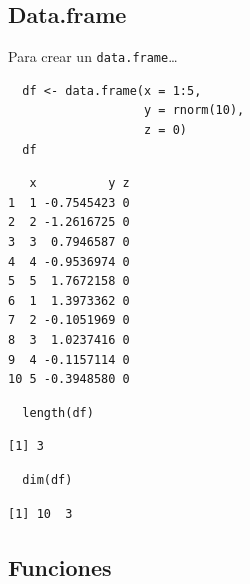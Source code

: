 \documentclass[xcolor={usenames,svgnames,dvipsnames}]{beamer}
\begin{document}
\subsection{Data.frame}
\label{sec-2-4}
\begin{frame}[fragile,label=sec-2-4-1]{Para crear un \texttt{data.frame}\ldots{}}
 \lstset{language=R,label= ,caption= ,numbers=none}
\begin{lstlisting}
  df <- data.frame(x = 1:5,
                   y = rnorm(10),
                   z = 0)
  df
\end{lstlisting}

\begin{verbatim}
   x          y z
1  1 -0.7545423 0
2  2 -1.2616725 0
3  3  0.7946587 0
4  4 -0.9536974 0
5  5  1.7672158 0
6  1  1.3973362 0
7  2 -0.1051969 0
8  3  1.0237416 0
9  4 -0.1157114 0
10 5 -0.3948580 0
\end{verbatim}

\lstset{language=R,label= ,caption= ,numbers=none}
\begin{lstlisting}
  length(df)
\end{lstlisting}

\begin{verbatim}
[1] 3
\end{verbatim}

\lstset{language=R,label= ,caption= ,numbers=none}
\begin{lstlisting}
  dim(df)
\end{lstlisting}

\begin{verbatim}
[1] 10  3
\end{verbatim}
\end{frame}

\subsection{Funciones}
\label{sec-2-5}
\end{document}
